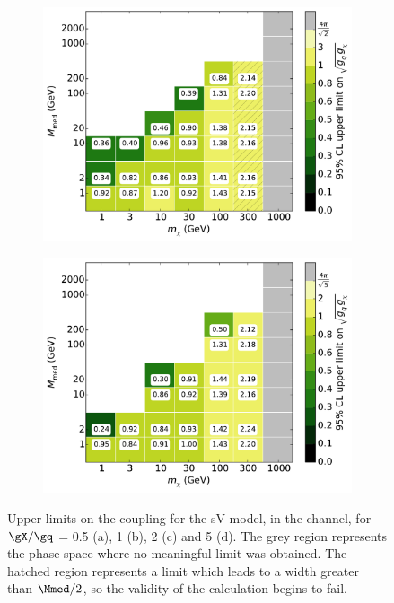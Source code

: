 \begin{figure}[h]
\begin{subfigure}[t]{0.495\textwidth}
      \caption{}
    \end{subfigure}
    \begin{subfigure}[t]{0.495\textwidth}
      \centering
      \includegraphics[width=1.\textwidth]{figures/grid_allpoints_SVD_rat2.pdf}
      \caption{}
    \end{subfigure}
    \begin{subfigure}[t]{0.495\textwidth}
      \centering
      \includegraphics[width=1.\textwidth]{figures/grid_allpoints_SVD_rat5.pdf}
      \caption{}
    \end{subfigure}
    \caption{Upper limits on the coupling for the sV model, in the \monoZ channel, for $\gX / \gq$ = 0.5 (a), 1 (b), 2 (c) and 5 (d). The grey region represents the phase space where no meaningful limit was obtained. The hatched region represents a limit which leads to a width greater than $\Mmed / 2$, so the validity of the calculation begins to fail.}
    \label{fig:MonoZ_SVD_couplinglimit}
\end{figure}

